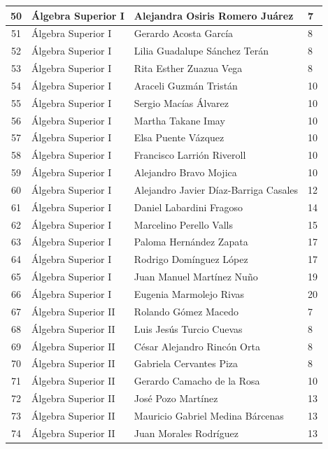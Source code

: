 {\begin{longtable}{|c|p{6.5cm}|p{5cm}|p{1.5cm}|}
  50 & Álgebra Superior I & Alejandra Osiris Romero Juárez & 7 \\ \hline
  51 & Álgebra Superior I & Gerardo Acosta García & 8 \\ \hline
  52 & Álgebra Superior I & Lilia Guadalupe Sánchez Terán & 8 \\ \hline
  53 & Álgebra Superior I & Rita Esther Zuazua Vega & 8 \\ \hline
  54 & Álgebra Superior I & Araceli Guzmán Tristán & 10 \\ \hline
  55 & Álgebra Superior I & Sergio Macías Álvarez & 10 \\ \hline
  56 & Álgebra Superior I & Martha Takane Imay & 10 \\ \hline
  57 & Álgebra Superior I & Elsa Puente Vázquez & 10 \\ \hline
  58 & Álgebra Superior I & Francisco Larrión Riveroll & 10 \\ \hline
  59 & Álgebra Superior I & Alejandro Bravo Mojica & 10 \\ \hline
  60 & Álgebra Superior I & Alejandro Javier Díaz-Barriga Casales & 12 \\ \hline
  61 & Álgebra Superior I & Daniel Labardini Fragoso & 14 \\ \hline
  62 & Álgebra Superior I & Marcelino Perello Valls & 15 \\ \hline
  63 & Álgebra Superior I & Paloma Hernández Zapata & 17 \\ \hline
  64 & Álgebra Superior I & Rodrigo Domínguez López & 17 \\ \hline
  65 & Álgebra Superior I & Juan Manuel Martínez Nuño & 19 \\ \hline
  66 & Álgebra Superior I & Eugenia Marmolejo Rivas & 20 \\ \hline
  67 & Álgebra Superior II & Rolando Gómez Macedo & 7 \\ \hline
  68 & Álgebra Superior II & Luis Jesús Turcio Cuevas & 8 \\ \hline
  69 & Álgebra Superior II & César Alejandro Rincón Orta & 8 \\ \hline
  70 & Álgebra Superior II & Gabriela Cervantes Piza & 8 \\ \hline
  71 & Álgebra Superior II & Gerardo Camacho de la Rosa & 10 \\ \hline
  72 & Álgebra Superior II & José Pozo Martínez & 13 \\ \hline
  73 & Álgebra Superior II & Mauricio Gabriel Medina Bárcenas & 13 \\ \hline
  74 & Álgebra Superior II & Juan Morales Rodríguez & 13 \\ \hline

\end{longtable}}
